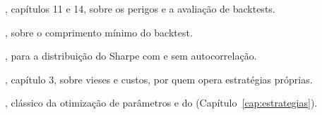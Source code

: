 \begin{leituras}
  \item \citet{lopezdeprado2018}, capítulos 11 e 14, sobre os perigos e a avaliação de backtests.
  \item \citet{bailey2014pseudo}, sobre o comprimento mínimo do backtest.
  \item \citet{lo2002}, para a distribuição do Sharpe com e sem autocorrelação.
  \item \citet{chan2021}, capítulo 3, sobre vieses e custos, por quem opera estratégias próprias.
  \item \citet{pardo2008}, clássico da otimização de parâmetros e do  (Capítulo~\ref{cap:estrategias}).
\end{leituras}
